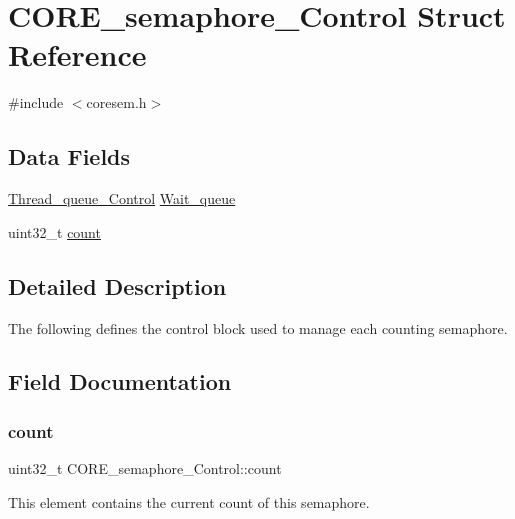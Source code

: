 \hypertarget{structCORE__semaphore__Control}{}\section{C\+O\+R\+E\+\_\+semaphore\+\_\+\+Control Struct Reference}
\label{structCORE__semaphore__Control}


{\ttfamily \#include $<$coresem.\+h$>$}

\subsection*{Data Fields}
\begin{DoxyCompactItemize}
\item 
\mbox{\hyperlink{structThread__queue__Control}{Thread\+\_\+queue\+\_\+\+Control}} \mbox{\hyperlink{structCORE__semaphore__Control_a7b846373edd48493ee42039bb58a83ad}{Wait\+\_\+queue}}
\item 
uint32\+\_\+t \mbox{\hyperlink{structCORE__semaphore__Control_aa1979a9534b9a95da19d00c7e2f9af99}{count}}
\end{DoxyCompactItemize}


\subsection{Detailed Description}
The following defines the control block used to manage each counting semaphore. 

\subsection{Field Documentation}
\mbox{\label{structCORE__semaphore__Control_aa1979a9534b9a95da19d00c7e2f9af99}} 
\subsubsection{\texorpdfstring{count}{count}}
{\footnotesize\ttfamily uint32\+\_\+t C\+O\+R\+E\+\_\+semaphore\+\_\+\+Control\+::count}

This element contains the current count of this semaphore. \mbox{\label{structCORE__semaphore__Control_a7b846373edd48493ee42039bb58a83ad}} 
